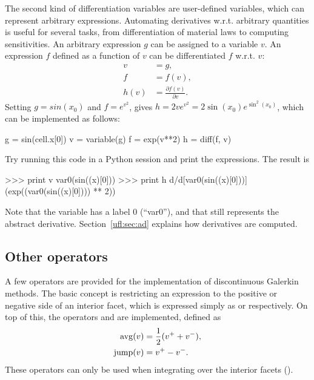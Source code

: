 The second kind of differentiation variables are user-defined
variables, which can represent arbitrary expressions.  Automating
derivatives w.r.t. arbitrary quantities is useful for several tasks,
from differentiation of material laws to computing sensitivities.  An
arbitrary expression $g$ can be assigned to a variable $v$.  An
expression $f$ defined as a function of $v$ can be differentiated $f$
w.r.t. $v$:
\begin{align}
v &= g, \\
f &= f(v), \\
h(v) &= \frac{\partial f(v)}{\partial v}.
\end{align}
Setting $g = sin(x_0)$ and $f = e^{v^2}$, gives $h = 2 v e^{v^2} = 2
\sin(x_0) e^{\sin^2(x_0)}$, which can be implemented as follows:
\begin{code}
g = sin(cell.x[0])
v = variable(g)
f = exp(v**2)
h = diff(f, v)
\end{code}
Try running this code in a Python session and print the expressions.
The result is
\begin{code}
>>> print v
var0(sin((x)[0]))
>>> print h
d/d[var0(sin((x)[0]))] (exp((var0(sin((x)[0]))) ** 2))
\end{code}
Note that the variable has a label 0 (``var0''), and that 
still represents the abstract derivative.  Section~\ref{ufl:sec:ad}
explains how derivatives are computed.

\subsection{Other operators}
\label{ufl:sec:conditionals}

A few operators are provided for the implementation of discontinuous
Galerkin methods.  The basic concept is restricting an expression to
the positive or negative side of an interior facet, which is expressed
simply as  or  respectively. On top of
this, the operators  and  are implemented,
defined as
\begin{align}
\operatorname{avg}(v)  &= \frac 1 2 (v^+ + v^-), \\
\operatorname{jump}(v) &= v^+ - v^- .
\end{align}
These operators can only be used when integrating over the interior
facets ().

